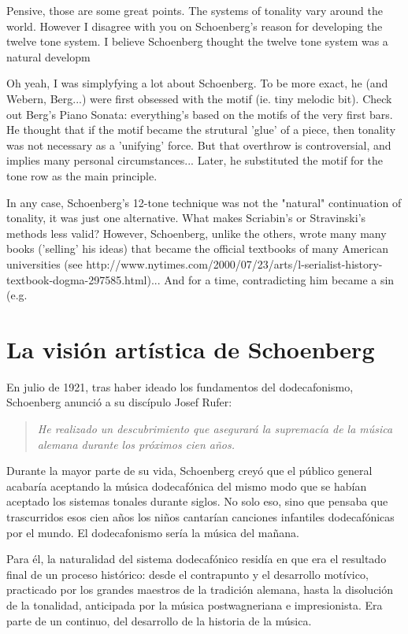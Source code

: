     
    Pensive, those are some great points. The systems of tonality vary around the world. However I disagree with you on Schoenberg's reason for developing the twelve tone system. I believe Schoenberg thought the twelve tone system was a natural developm
    
        
    Oh yeah, I was simplyfying a lot about Schoenberg. To be more exact, he (and Webern, Berg...) were first obsessed with the motif (ie. tiny melodic bit). Check out Berg's Piano Sonata: everything's based on the motifs of the very first bars. He thought that if the motif became the strutural 'glue' of a piece, then tonality was not necessary as a 'unifying' force. But that overthrow is controversial, and implies many personal circumstances... Later, he substituted the motif for the tone row as the main principle.
    
    In any case, Schoenberg's 12-tone technique was not the "natural" continuation of tonality, it was just one alternative. What makes Scriabin's or Stravinski's methods less valid? However, Schoenberg, unlike the others, wrote many many books ('selling' his ideas) that became the official textbooks of many American universities (see http://www.nytimes.com/2000/07/23/arts/l-serialist-history-textbook-dogma-297585.html)... And for a time, contradicting him became a sin (e.g. %
    
    \section{La visión artística de Schoenberg}
    En julio de 1921, tras haber ideado los fundamentos del dodecafonismo, Schoenberg anunció a su discípulo Josef Rufer: \begin{quote}\emph{He realizado un descubrimiento que asegurará la supremacía de la música alemana durante los próximos cien años.}\end{quote}Durante la mayor parte de su vida, Schoenberg creyó que el público general acabaría aceptando la música dodecafónica del mismo modo que se habían aceptado los sistemas tonales durante siglos. No solo eso, sino que pensaba que trascurridos esos cien años los niños cantarían canciones infantiles dodecafónicas por el mundo. El dodecafonismo sería la música del mañana.
    
    Para él, la naturalidad del sistema dodecafónico residía en que era el resultado final de un proceso histórico: desde el contrapunto y el desarrollo motívico, practicado por los grandes maestros de la tradición alemana, hasta la disolución de la tonalidad, anticipada por la música postwagneriana e impresionista. Era parte de un continuo, del desarrollo de la historia de la música.
    

